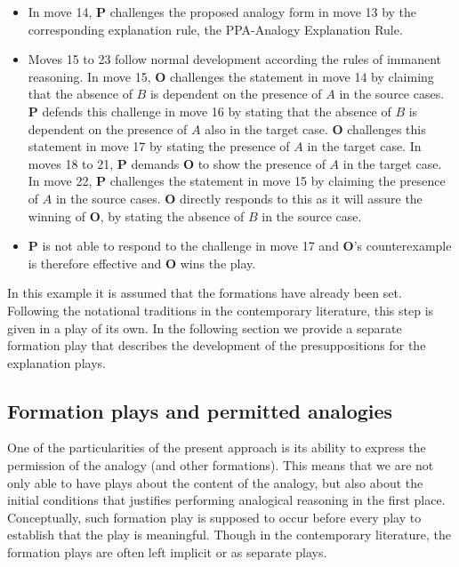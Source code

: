 \begin{itemize}
				\item In move 14, \textbf{P} challenges the proposed analogy form in move 13 by the corresponding explanation rule, the PPA-Analogy Explanation Rule. 
				\item Moves 15 to 23 follow normal development according the rules of immanent reasoning. In move 15, \textbf{O} challenges the statement in move 14 by claiming that the absence of $B$ is dependent on the presence of $A$ in the source cases. \textbf{P} defends this challenge in move 16 by stating that the absence of $B$ is dependent on the presence of $A$ also in the target case. \textbf{O} challenges this statement in move 17 by stating the presence of $A$ in the target case. In moves 18 to 21, \textbf{P} demands \textbf{O} to show the presence of $A$ in the target case. In move 22, \textbf{P} challenges the statement in move 15 by claiming the presence of $A$ in the source cases. \textbf{O} directly responds to this as it will assure the winning of \textbf{O}, by stating the absence of $B$ in the source case. 
				\item \textbf{P} is not able to respond to the challenge in move 17 and \textbf{O}'s counterexample is therefore effective and \textbf{O} wins the play.
			\end{itemize}
			
			In this example it is assumed that the formations have already been set. Following the notational traditions in the contemporary literature, this step is given in a play of its own. In the following section we provide a separate formation play that describes the development of the presuppositions for the explanation plays.
			
	\subsection{Formation plays and permitted analogies}\label{FormationDialogAnalogy}
		
		One of the particularities of the present approach is its ability to express the permission of the analogy (and other formations). This means that we are not only able to have plays about the content of the analogy, but also about the initial conditions that justifies performing analogical reasoning in the first place. Conceptually, such formation play is supposed to occur before every play to establish that the play is meaningful. Though in the contemporary literature, the formation plays are often left implicit or as separate plays. 
		
